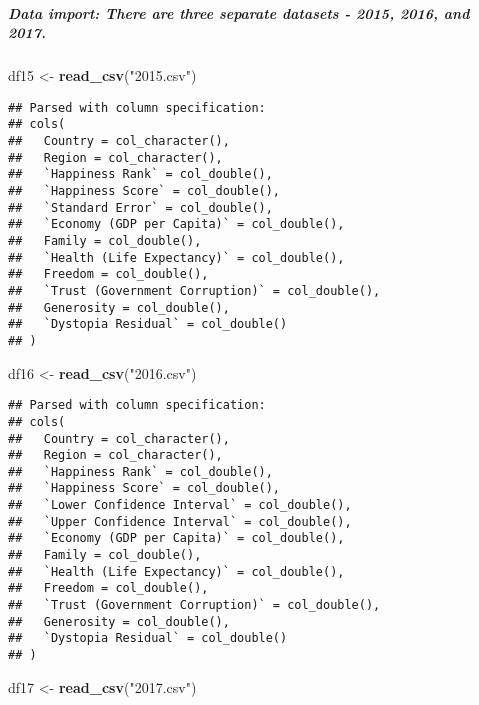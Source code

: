 \documentclass[]{article}
\newenvironment{Shaded}{\begin{snugshade}}{\end{snugshade}}
\newcommand{\KeywordTok}[1]{\textcolor[rgb]{0.13,0.29,0.53}{\textbf{#1}}}
\newcommand{\NormalTok}[1]{#1}
\newcommand{\StringTok}[1]{\textcolor[rgb]{0.31,0.60,0.02}{#1}}
\let\oldsubparagraph\subparagraph
\renewcommand{\subparagraph}[1]{\oldsubparagraph{#1}\mbox{}}
\begin{document}
\hypertarget{data-import-there-are-three-separate-datasets---2015-2016-and-2017.}{%
\subparagraph{Data import: There are three separate datasets - 2015,
2016, and
2017.}\label{data-import-there-are-three-separate-datasets---2015-2016-and-2017.}}

\begin{Shaded}
\begin{Highlighting}[]
\NormalTok{df15 <-}\StringTok{ }\KeywordTok{read_csv}\NormalTok{(}\StringTok{"2015.csv"}\NormalTok{)}
\end{Highlighting}
\end{Shaded}

\begin{verbatim}
## Parsed with column specification:
## cols(
##   Country = col_character(),
##   Region = col_character(),
##   `Happiness Rank` = col_double(),
##   `Happiness Score` = col_double(),
##   `Standard Error` = col_double(),
##   `Economy (GDP per Capita)` = col_double(),
##   Family = col_double(),
##   `Health (Life Expectancy)` = col_double(),
##   Freedom = col_double(),
##   `Trust (Government Corruption)` = col_double(),
##   Generosity = col_double(),
##   `Dystopia Residual` = col_double()
## )
\end{verbatim}

\begin{Shaded}
\begin{Highlighting}[]
\NormalTok{df16 <-}\StringTok{ }\KeywordTok{read_csv}\NormalTok{(}\StringTok{"2016.csv"}\NormalTok{)}
\end{Highlighting}
\end{Shaded}

\begin{verbatim}
## Parsed with column specification:
## cols(
##   Country = col_character(),
##   Region = col_character(),
##   `Happiness Rank` = col_double(),
##   `Happiness Score` = col_double(),
##   `Lower Confidence Interval` = col_double(),
##   `Upper Confidence Interval` = col_double(),
##   `Economy (GDP per Capita)` = col_double(),
##   Family = col_double(),
##   `Health (Life Expectancy)` = col_double(),
##   Freedom = col_double(),
##   `Trust (Government Corruption)` = col_double(),
##   Generosity = col_double(),
##   `Dystopia Residual` = col_double()
## )
\end{verbatim}

\begin{Shaded}
\begin{Highlighting}[]
\NormalTok{df17 <-}\StringTok{ }\KeywordTok{read_csv}\NormalTok{(}\StringTok{"2017.csv"}\NormalTok{)}
\end{Highlighting}
\end{Shaded}
\end{document}
